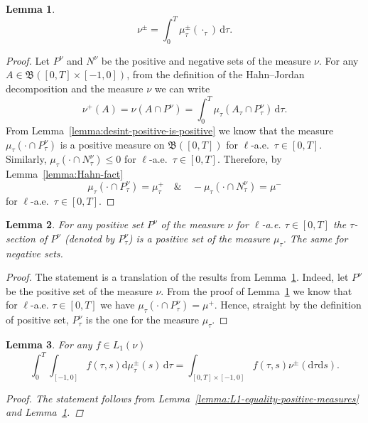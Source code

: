 \documentclass[reqno]{amsart}
\theoremstyle{plain}
\newtheorem{lemma}{Lemma}[section]
\numberwithin{equation}{section}
\numberwithin{definition}{section}
\newcommand{\dd}{\ensuremath{\mathrm{d}}}
\begin{document}
\begin{lemma}\label{lemma:mu+/-_desint}~
 \begin{equation*}
  \nu^{\pm}= \int_{0}^T \mu_{\tau}^{\pm}(\cdot_{\tau})\,\dd \tau. 
\end{equation*} 
\end{lemma}
\begin{proof}
   Let $P^{\nu}$ and $N^{\nu}$ be the positive and negative sets of the measure $\nu$.  For any $A\in \mathfrak{B}([0,T]\times[-1,0])$, from the definition of the Hahn--Jordan decomposition and the measure $\nu$ we can write 
   \begin{equation*}
       \nu^+(A)= \nu(A\cap P^{\nu}) = \int_{0}^T \mu_{\tau}(A_{\tau}\cap P^{\nu}_{\tau})\,\dd \tau. 
   \end{equation*}
   From Lemma~\ref{lemma:desint-positive-is-positive} we know that the measure $\mu_{\tau}(\cdot \cap P^{\nu}_{\tau})$ is a positive measure on $\mathfrak{B} ([0,T])$ for $\ell$-a.e.\ $\tau\in [0,T]$. Similarly, $\mu_{\tau}(\cdot \cap N^{\nu}_{\tau})\le 0$ for $\ell$-a.e.\ $\tau\in [0,T]$. Therefore, by Lemma~\ref{lemma:Hahn-fact}  
   \begin{equation*}
    \mu_{\tau}(\cdot \cap P^{\nu}_{\tau}) = \mu_{\tau}^+ \quad \& \quad   -\mu_{\tau}(\cdot \cap N^{\nu}_{\tau}) = \mu^-
   \end{equation*}
   for $\ell$-a.e.\ $\tau\in [0,T]$. 
\end{proof}
\begin{lemma}
       For any positive set $P^{\nu}$ of the measure $\nu$ for $\ell$-a.e. $\tau\in [0,T]$ the $\tau$-section of $P^{\nu}$ (denoted by $P^{\nu}_{\tau}$) is a positive set of the measure $\mu_{\tau}$. The same for negative sets.      
\end{lemma}
\begin{proof}
   The statement is a translation of the results from Lemma~\ref{lemma:mu+/-_desint}. Indeed, let $P^{\nu}$ be the positive set of the measure $\nu$. From the proof of Lemma~\ref{lemma:mu+/-_desint} we know that for $\ell$-a.e. $\tau\in [0,T]$ we have $\mu_{\tau}(\cdot \cap P^{\nu}_{\tau}) = \mu^+$. Hence, straight by the definition of positive set, $P^{\nu}_{\tau}$ is the one for the measure $\mu_{\tau}$. 
\end{proof}
\begin{lemma}\label{lemma:nu-mi-l1-for_+/-}
    For any $f\in L_1(\nu)$ 
 \begin{equation*}
  \int_0^T \int_{[-1,0]} f(\tau,s) \dd \mu_{\tau}^{\pm} (s) \,\dd\tau = \int_{[0,T]\times [-1,0]} f(\tau,s) \nu^{\pm} (\dd \tau\dd s ). 
\end{equation*} 
\begin{proof}
    The statement follows from Lemma~\ref{lemma:L1-equality-positive-measures} and Lemma~\ref{lemma:mu+/-_desint}.
\end{proof}
\end{lemma}
\end{document}
